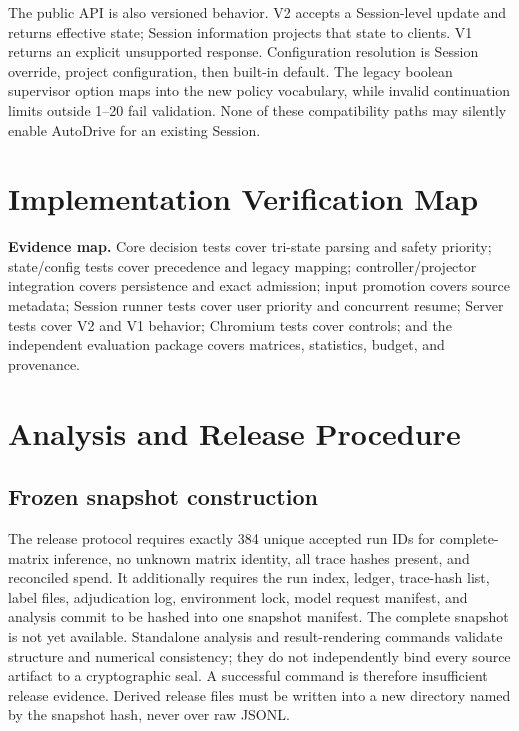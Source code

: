 The public API is also versioned behavior. V2 accepts a Session-level update and returns effective state; Session information projects that state to clients. V1 returns an explicit unsupported response. Configuration resolution is Session override, project configuration, then built-in default. The legacy boolean supervisor option maps into the new policy vocabulary, while invalid continuation limits outside 1--20 fail validation. None of these compatibility paths may silently enable AutoDrive for an existing Session.

\section{Implementation Verification Map}

\textbf{Evidence map.} Core decision tests cover tri-state parsing and safety priority; state/config tests cover precedence and legacy mapping; controller/projector integration covers persistence and exact admission; input promotion covers source metadata; Session runner tests cover user priority and concurrent resume; Server tests cover V2 and V1 behavior; Chromium tests cover controls; and the independent evaluation package covers matrices, statistics, budget, and provenance.

\section{Analysis and Release Procedure}

\subsection{Frozen snapshot construction}

The release protocol requires exactly 384 unique accepted run IDs for complete-matrix inference, no unknown matrix identity, all trace hashes present, and reconciled spend. It additionally requires the run index, ledger, trace-hash list, label files, adjudication log, environment lock, model request manifest, and analysis commit to be hashed into one snapshot manifest. The complete snapshot is not yet available. Standalone analysis and result-rendering commands validate structure and numerical consistency; they do not independently bind every source artifact to a cryptographic seal. A successful command is therefore insufficient release evidence. Derived release files must be written into a new directory named by the snapshot hash, never over raw JSONL.

